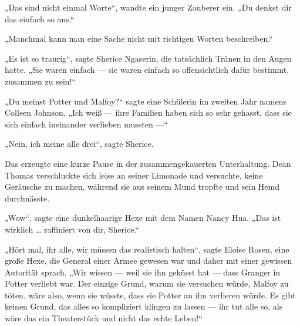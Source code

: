 „Das sind nicht einmal Worte“, wandte ein junger Zauberer ein.
„Du denkst dir das einfach so aus.“

„Manchmal kann man eine Sache nicht mit richtigen Worten beschreiben.“

„Es ist so traurig“, sagte Sherice Ngaserin, die tatsächlich Tränen in den Augen hatte.
„Sie waren einfach — sie waren einfach so offensichtlich dafür bestimmt, zusammen zu sein!“

„Du meinst Potter und Malfoy?“ sagte eine Schülerin im zweiten Jahr namens Colleen Johnson.
„Ich weiß — ihre Familien haben sich so sehr gehasst, dass sie sich einfach ineinander verlieben mussten —“

„Nein, ich meine alle drei“, sagte Sherice.

Das erzeugte eine kurze Pause in der zusammengekauerten Unterhaltung. Dean Thomas verschluckte sich leise an seiner Limonade und versuchte, keine Geräusche zu machen, während sie aus seinem Mund tropfte und sein Hemd durchnässte.

„Wow“, sagte eine dunkelhaarige Hexe mit dem Namen Nancy Hua.
„Das ist wirklich … raffiniert von dir, Sherice.“

„Hört mal, ihr alle, wir müssen das realistisch halten“, sagte Eloise Rosen, eine große Hexe, die General einer Armee gewesen war und daher mit einer gewissen Autorität sprach.
„Wir wissen — weil sie ihn geküsst hat — dass Granger in Potter verliebt war. Der einzige Grund, warum sie versuchen würde, Malfoy zu töten, wäre also, wenn sie wüsste, dass sie Potter an ihn verlieren würde. Es gibt keinen Grund, das alles so kompliziert klingen zu lassen — ihr tut alle so, als wäre das ein Theaterstück und nicht das echte Leben!“

